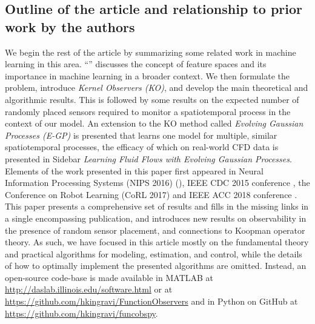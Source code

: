 \subsection*{Outline of the article and relationship to prior work by the authors}
 We begin the rest of the article by summarizing some related work in machine learning in this area.  ``'' discusses the concept of feature spaces and its importance in machine learning in a broader context. We then formulate the problem, introduce \emph{Kernel Observers (KO)}, and develop the main theoretical and algorithmic results.
This is followed by some results on the expected number of randomly placed sensors required to monitor a spatiotemporal process in the context of our model. An extension to the KO method called \emph{Evolving Gaussian Processes (E-GP)} is presented that learns one model for multiple, similar spatiotemporal processes, the efficacy of which on real-world CFD data is presented in Sidebar \emph{Learning Fluid Flows with Evolving Gaussian Processes}.
Elements of the work presented in this paper first appeared in Neural Information Processing Systems (NIPS 2016) (\cite{Kingravi16_NIPS,whitman2016NIPSworkshop}), IEEE CDC 2015 conference \cite{Kingravi:2015a}, the Conference on Robot Learning (CoRL 2017) \cite{whitman2017learning} and IEEE ACC 2018 conference \cite{Maske18_ACC}.  This paper presents a comprehensive set of results and fills in the missing links in a single encompassing publication, and introduces new results on observability in the presence of random sensor placement, and connections to Koopman operator theory. As such, we have focused in this article mostly on the fundamental theory and practical algorithms for modeling, estimation, and control, while the details of how to optimally implement the presented algorithms are omitted. Instead, an open-source code-base is made available in MATLAB at \url{http://daslab.illinois.edu/software.html} or at \url{https://github.com/hkingravi/FunctionObservers} and in Python on GitHub at \url{https://github.com/hkingravi/funcobspy}.

